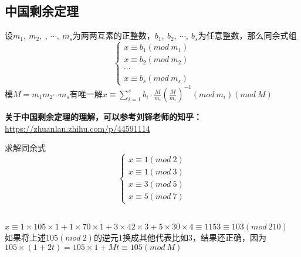 \documentclass[cn,10pt]{elegantbook}
\begin{document}
\subsection{中国剩余定理}
\begin{theorem}[CRT]
  设$m_1,\ m_2,\ ,\ \cdots ,\ m_s$为两两互素的正整数，$b_1,\ b_2,\ \cdots ,\ b_s$为任意整数，那么同余式组
  \[
    \left\{
      \begin{matrix}
        x \equiv b_1 (mod\ m_1)
        \\ x \equiv b_2(mod\ m_2)
        \\ \cdots 
        \\x \equiv b_s(mod\ m_s)
      \end{matrix}
    \right.
  \]
  模$M = m_1m_2 \cdots m_s$有唯一解$x \equiv \sum_{i=1}^sb_i \cdot \frac{M}{m_i}(\frac{M}{m_i})^{-1}(mod\ m_i)(mod\ M)$
\end{theorem}
\textbf{关于中国剩余定理的理解，可以参考刘铎老师的知乎：}
\href{https://zhuanlan.zhihu.com/p/44591114
}{https://zhuanlan.zhihu.com/p/44591114
}
\\
\begin{example}
  求解同余式
  \[
    \begin{cases}
      x \equiv 1(mod\ 2)
      \\ x \equiv 1(mod\ 3)
      \\ x \equiv 3(mod\ 5)
      \\ x \equiv 5(mod\ 7)
    \end{cases}
  \]
\end{example}
\vskip 0.5cm
\begin{solution}
  \\ $x \equiv 1 \times 105 \times 1 + 1 \times 70 \times 1 +3 \times 42 \times 3 +5 \times 30 \times 4 \equiv 1153 \equiv 103(mod\ 210)$
  \\如果将上述$105(mod\ 2)$的逆元1换成其他代表比如3，结果还正确，因为$105 \times (1+2t) = 105 \times 1 +Mt \equiv 105 (mod\ M)$
\end{solution}
\end{document}
